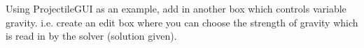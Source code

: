 \documentclass[12pt]{report}
\begin{document}
\begin{tcolorbox}[title=Task (Optional)]
Using ProjectileGUI as an example, add in another box which controls variable gravity. i.e. create an edit box where you can choose the strength of gravity which is read in by the solver (solution given).
\end{tcolorbox}
\end{document}

